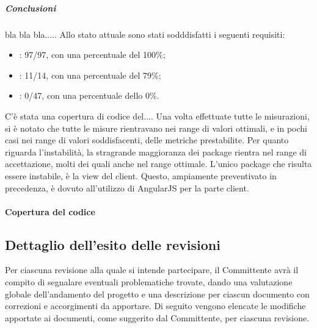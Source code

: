 \subparagraph{Conclusioni}
bla bla bla.....
Allo stato attuale sono stati sodddisfatti i seguenti requisiti:
\begin{itemize}
\item {}: 97/97, con una percentuale del 100\%;
\item {}: 11/14, con una percentuale del 79\%;
\item {}: 0/47, con una percentuale dello 0\%.
\end{itemize}
C'è stata una copertura di codice del....
Una volta effettuate tutte le misurazioni, si è notato che tutte le misure rientravano nei range  di valori ottimali, e in pochi casi nei range di valori soddisfacenti, delle metriche prestabilite.
Per quanto riguarda l'instabilità, la stragrande maggioranza dei package rientra nel range di accettazione, molti dei quali anche nel range ottimale. L'unico package che risulta essere instabile, è la view del client. Questo, ampiamente preventivato in precedenza, è dovuto all'utilizzo di AngularJS per la parte client.

\paragraph{Copertura del codice}









\subsection{Dettaglio dell'esito delle revisioni}
Per ciascuna revisione alla quale si intende partecipare, il Committente avrà il compito di segnalare eventuali problematiche trovate, dando una valutazione globale dell'andamento del progetto e una descrizione per ciascun documento con correzioni e accorgimenti da apportare.
Di seguito vengono elencate le modifiche apportate ai documenti, come suggerito dal Committente, per ciascuna revisione.

